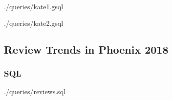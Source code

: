 
{./queries/kate1.gsql}



{./queries/kate2.gsql}

\subsection{Review Trends in Phoenix 2018}

\subsubsection{SQL}



{./queries/reviews.sql}

